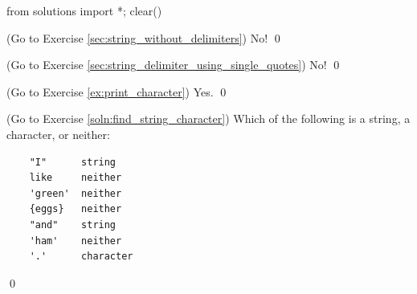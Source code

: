 \begin{python0}
from solutions import *; clear()
\end{python0}

\begin{soln} \label{sec:string_without_delimiters_soln}
(Go to Exercise \ref{sec:string_without_delimiters})
No!
\qed
\end{soln}

\begin{soln} \label{sec:string_delimiter_using_single_quotes_soln}
(Go to Exercise \ref{sec:string_delimiter_using_single_quotes})
No!
\qed
\end{soln}

\begin{soln} \label{soln:print_character}
(Go to Exercise \ref{ex:print_character})
Yes.
\qed
\end{soln}

\begin{soln} \label{ex:find_string_character}
(Go to Exercise \ref{soln:find_string_character})
Which of the following is a string, a character, or neither:
\begin{verbatim}
    "I"      string
    like     neither
    'green'  neither
    {eggs}   neither
    "and"    string
    'ham'    neither
    '.'      character
\end{verbatim}
\qed
\end{soln}


